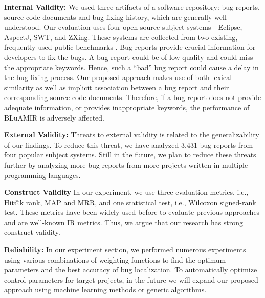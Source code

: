 \documentclass[sigconf,review,anonymous]{acmart}
\begin{document}
\textbf{Internal Validity:} We used three artifacts of a software repository: bug reports, source code documents and bug fixing history, which are generally well understood. Our evaluation uses four open source subject systems - Eclipse, AspectJ, SWT, and ZXing. These systems are collected from two existing, frequently used public benchmarks \cite{Jian, Saha}. 
Bug reports provide crucial information for developers to fix the bugs.
A bug report could be of low quality and could miss the appropriate keywords.
Hence, such a “bad” bug report could cause a delay in the bug fixing process. Our proposed approach makes use of both lexical similarity as well as implicit association between a bug report and their corresponding source code documents. Therefore, if a bug report does not provide adequate information, or provides inappropriate keywords, the performance of BLuAMIR is adversely affected.

\textbf{External Validity:} 
Threats to external validity is related to the generalizability of our findings. 
To reduce this threat, we have analyzed 3,431 bug reports from four popular subject systems.  
Still in the future, we plan to reduce these threats further by analyzing more bug reports from more projects written in multiple programming languages.


\textbf{Construct Validity}
In our experiment, we use three evaluation metrics, i.e., Hit@k rank, MAP and MRR, and one statistical test, i.e., Wilcoxon signed-rank test. These metrics have been widely used before to evaluate previous approaches \cite{Jian, Saha} and are well-known IR metrics. Thus, we argue that our research has strong construct validity.

\textbf{Reliability:}
In our experiment section, we performed numerous experiments using various combinations of weighting functions to find the optimum parameters and the best accuracy of bug localization. 
To automatically optimize control parameters for target projects, in the future we will expand our proposed approach using machine learning methods or generic algorithms.
\end{document}
